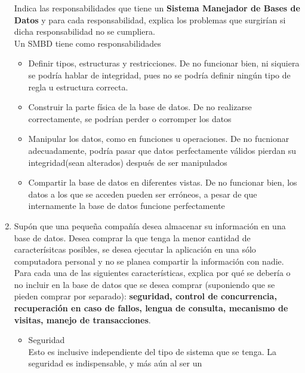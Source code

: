 \documentclass{article}
\begin{document}
\begin{enumerate}[label=\alph*.]
{            Indica las responsabilidades que tiene un \textbf{Sistema Manejador
            de Bases de Datos} y para cada responsabilidad, explica los problemas
            que surgirían si dicha responsabilidad no se cumpliera. \\
            Un SMBD tiene como responsabilidades
            \begin{itemize}
                \item {Definir tipos, estructuras y restricciones. De no 
                funcionar bien, ni siquiera se podría hablar de integridad, pues
                no se podría definir ningún tipo de regla u estructura correcta.}
                \item {Construir la parte física de la base de datos. De no 
                realizarse correctamente, se podrían perder o corromper los datos}
                \item {Manipular los datos, como en funciones u operaciones. De
                no fucnionar adecuadamente, podría pasar que datos perfectamente
                válidos pierdan su integridad(sean alterados) después de ser 
                manipulados}
                \item {Compartir la base de datos en diferentes vistas. De no 
                funcionar bien, los datos a los que se acceden pueden ser erróneos,
                a pesar de que internamente la base de datos funcione 
                perfectamente}
            \end{itemize}
        }
        \item {
            Supón que una pequeña compañía desea almacenar su información en una
            base de datos. Desea comprar la que tenga la menor cantidad de 
            caracterísitcas posibles, se desea ejecutar la aplicación en una 
            sólo computadora personal y no se planea compartir la información con
            nadie. Para cada una de las siguientes características, explica por
            qué se debería o no incluir en la base de datos que se desea comprar
            (suponiendo que se pieden comprar por separado): \textbf{seguridad, 
            control de concurrencia, recuperación en caso de fallos, lengua de 
            consulta, mecanismo de visitas, manejo de transacciones}.
            \begin{itemize}
                \item {Seguridad \\
                Esto es inclusive independiente del tipo de sistema que se 
                tenga. La seguridad es indispensable, y más aún al ser un 
}
\end{itemize}}
\end{enumerate}
\end{document}
